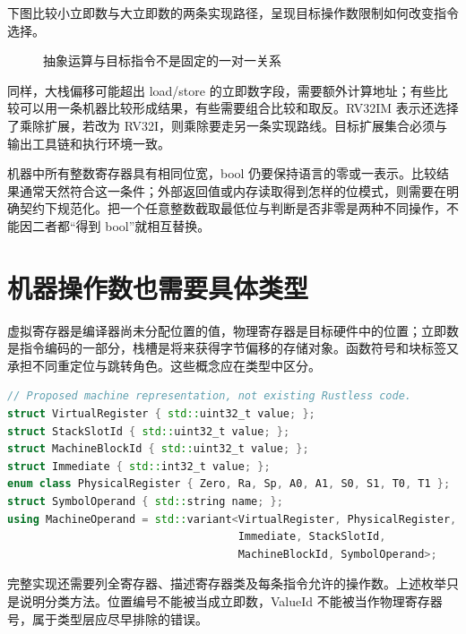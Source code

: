 下图比较小立即数与大立即数的两条实现路径，呈现目标操作数限制如何改变指令选择。
\begin{figure}[htbp]\centering
{}
\caption{抽象运算与目标指令不是固定的一对一关系}
\end{figure}

同样，大栈偏移可能超出 load/store 的立即数字段，需要额外计算地址；有些比较可以用一条机器比较形成结果，有些需要组合比较和取反。RV32IM 表示还选择了乘除扩展，若改为 RV32I，则乘除要走另一条实现路线。目标扩展集合必须与输出工具链和执行环境一致。

机器中所有整数寄存器具有相同位宽，bool 仍要保持语言的零或一表示。比较结果通常天然符合这一条件；外部返回值或内存读取得到怎样的位模式，则需要在明确契约下规范化。把一个任意整数截取最低位与判断是否非零是两种不同操作，不能因二者都“得到 bool”就相互替换。

\section{机器操作数也需要具体类型}
虚拟寄存器是编译器尚未分配位置的值，物理寄存器是目标硬件中的位置；立即数是指令编码的一部分，栈槽是将来获得字节偏移的存储对象。函数符号和块标签又承担不同重定位与跳转角色。这些概念应在类型中区分。

\begin{lstlisting}[language=C++,caption={教学建议：机器操作数避免混用多种编号}]
// Proposed machine representation, not existing Rustless code.
struct VirtualRegister { std::uint32_t value; };
struct StackSlotId { std::uint32_t value; };
struct MachineBlockId { std::uint32_t value; };
struct Immediate { std::int32_t value; };
enum class PhysicalRegister { Zero, Ra, Sp, A0, A1, S0, S1, T0, T1 };
struct SymbolOperand { std::string name; };
using MachineOperand = std::variant<VirtualRegister, PhysicalRegister,
                                    Immediate, StackSlotId,
                                    MachineBlockId, SymbolOperand>;
\end{lstlisting}
完整实现还需要列全寄存器、描述寄存器类及每条指令允许的操作数。上述枚举只是说明分类方法。位置编号不能被当成立即数，ValueId 不能被当作物理寄存器号，属于类型层应尽早排除的错误。


